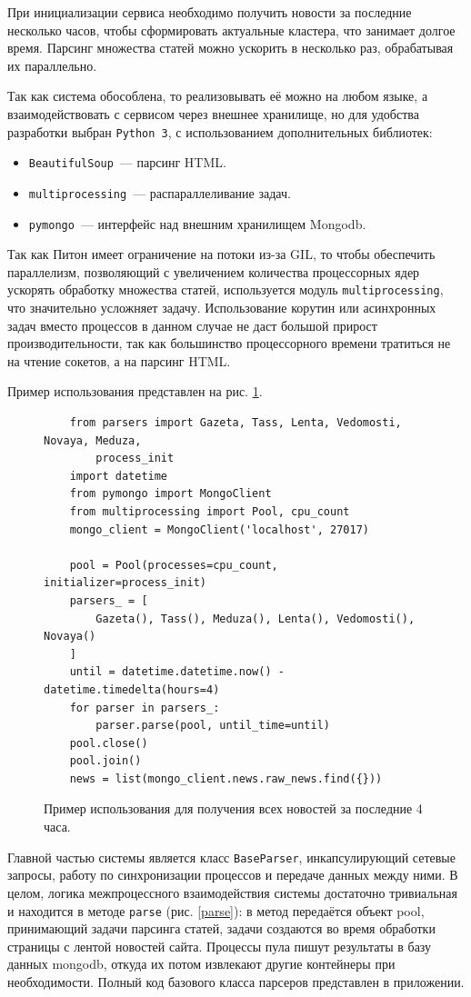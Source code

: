 \documentclass[a4paper, 14pt]{extarticle}
\begin{document}
При инициализации сервиса необходимо получить новости за последние несколько часов, чтобы сформировать актуальные кластера, что занимает долгое время. Парсинг множества статей можно ускорить в несколько раз, обрабатывая их параллельно.

Так как система обособлена, то реализовывать её можно на любом языке, а взаимодействовать с сервисом через внешнее хранилище, но для удобства разработки выбран \texttt{Python 3}, с использованием дополнительных библиотек: 
\begin{itemize}
	\item \texttt{BeautifulSoup}~--- парсинг HTML.
	\item \texttt{multiprocessing}~--- распараллеливание задач.
	\item \texttt{pymongo}~--- интерфейс над внешним хранилищем Mongodb.
\end{itemize}

Так как Питон имеет ограничение на потоки из-за GIL, то чтобы обеспечить параллелизм, позволяющий с увеличением количества процессорных ядер ускорять обработку множества статей, используется модуль \texttt{multiprocessing}, что значительно усложняет задачу. Использование корутин или асинхронных задач вместо процессов в данном случае не даст большой прирост производительности, так как большинство процессорного времени тратиться не на чтение сокетов, а на парсинг HTML. 

Пример использования представлен на рис. \ref{example}. 

\begin{figure}
	\centering
	\begin{verbatim}
	from parsers import Gazeta, Tass, Lenta, Vedomosti, Novaya, Meduza,
	    process_init
	import datetime
	from pymongo import MongoClient
	from multiprocessing import Pool, cpu_count
	mongo_client = MongoClient('localhost', 27017)
	
	pool = Pool(processes=cpu_count, initializer=process_init)
	parsers_ = [
	    Gazeta(), Tass(), Meduza(), Lenta(), Vedomosti(), Novaya()
	]
	until = datetime.datetime.now() - datetime.timedelta(hours=4)
	for parser in parsers_:
	    parser.parse(pool, until_time=until)
	pool.close()
	pool.join()
	news = list(mongo_client.news.raw_news.find({}))
	\end{verbatim}
	\caption{Пример использования для получения всех новостей за последние 4 часа.}
	\label{example}
\end{figure}

Главной частью системы является класс \texttt{BaseParser}, инкапсулирующий сетевые запросы, работу по синхронизации процессов и передаче данных между ними. В целом, логика межпроцессного взаимодействия системы достаточно тривиальная и находится в методе \texttt{parse} (рис. \ref{parse}): в метод передаётся объект pool, принимающий задачи парсинга статей, задачи создаются во время обработки страницы с лентой новостей сайта. Процессы пула пишут результаты в базу данных mongodb, откуда их потом извлекают другие контейнеры при необходимости.  Полный код базового класса парсеров представлен в приложении.
\end{document}

